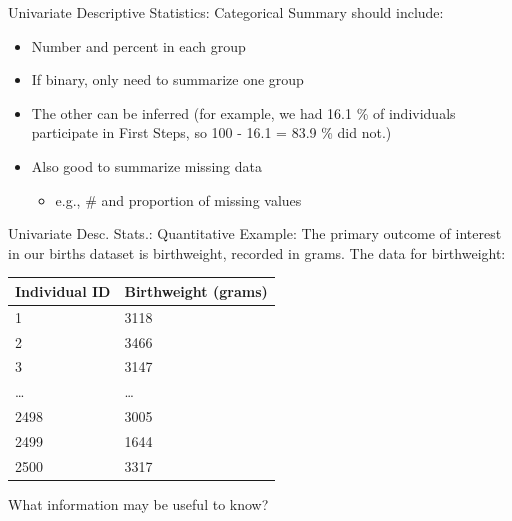\documentclass[
  ignorenonframetext,
]{beamer}
\providecommand{\tightlist}{%
  \setlength{\itemsep}{0pt}\setlength{\parskip}{0pt}}
\begin{document}
\begin{frame}{Univariate Descriptive Statistics: Categorical}
\protect\hypertarget{univariate-descriptive-statistics-categorical-3}{}
Summary should include:

\begin{itemize}
\item
  Number and percent in each group
\item
  If binary, only need to summarize one group
\item
  The other can be inferred (for example, we had 16.1 \% of individuals
  participate in First Steps, so 100 - 16.1 = 83.9 \% did not.)
\item
  Also good to summarize missing data

  \begin{itemize}
  \tightlist
  \item
    e.g., \# and proportion of missing values
  \end{itemize}
\end{itemize}
\end{frame}

\begin{frame}{Univariate Desc. Stats.: Quantitative}
\protect\hypertarget{univariate-desc.-stats.-quantitative}{}
{Example}: The primary outcome of interest in our births dataset is
birthweight, recorded in grams. The data for birthweight:

\begin{longtable}[]{@{}ll@{}}
\toprule
\textbf{Individual ID} & \textbf{Birthweight (grams)} \\
\midrule
\endhead
1 & 3118 \\
2 & 3466 \\
3 & 3147 \\
\ldots{} & \ldots{} \\
2498 & 3005 \\
2499 & 1644 \\
2500 & 3317 \\
\bottomrule
\end{longtable}

What information may be useful to know?
\end{frame}
\end{document}
